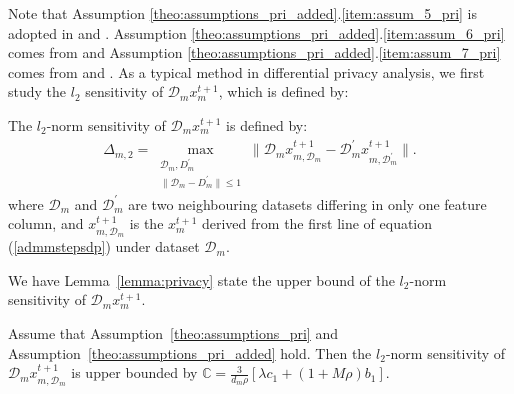 Note that Assumption \ref{theo:assumptions_pri_added}.\ref{item:assum_5_pri} is adopted in \cite{sarwate2013signal} and \cite{wang2019global}. Assumption \ref{theo:assumptions_pri_added}.\ref{item:assum_6_pri} comes from \cite{zhang2017dynamic} and Assumption \ref{theo:assumptions_pri_added}.\ref{item:assum_7_pri} comes from \cite{zhang2017dynamic}
and \cite{sarwate2013signal}. As a typical method in differential privacy analysis, we first study the $l_2$ sensitivity of
$\mathcal{D}_mx_m^{t+1}$, which is defined by:
\begin{defi}
The $l_2$-norm sensitivity of $\mathcal{D}_mx_m^{t+1}$ is defined by:
  \begin{eqnarray*}
\Delta_{m,2}=\max_{\substack{\mathcal{D}_m,D_m^{\prime}\\
\|\mathcal{D}_m-D_m^{\prime}\|\leq1
}}\|\mathcal{D}_mx_{m,\mathcal{D}_m}^{t+1}
-\mathcal{D}_m^{\prime}x_{m,\mathcal{D}_m^{\prime}}^{t+1}\|.
  \end{eqnarray*}
  where $\mathcal{D}_m$ and $\mathcal{D}_m^{\prime}$ are two neighbouring datasets differing in 
  only one feature column, and 
  $x_{m,\mathcal{D}_m}^{t+1}$ is the $x_m^{t+1}$ derived from the first line of equation 
  (\ref{admmstepsdp}) under dataset $\mathcal{D}_m$.
\end{defi}
We have Lemma~\ref{lemma:privacy} state the upper bound of the $l_2$-norm sensitivity of $\mathcal{D}_mx_m^{t+1}$.
\begin{lemma}
\label{lemma:privacy}
  Assume that Assumption~\ref{theo:assumptions_pri} and Assumption~\ref{theo:assumptions_pri_added} hold.
Then the $l_2$-norm sensitivity of $\mathcal{D}_mx_{m,\mathcal{D}_m}^{t+1}$ is upper bounded by $\mathbb{C}=\frac{3}{d_m\rho}\left[\lambda c_1+(1+M\rho)b_1\right]$.
\end{lemma}

